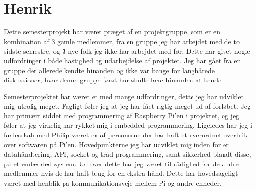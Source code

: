\section{Henrik}

Dette semesterprojekt har været præget af en projektgruppe, som er en kombination af 3 gamle medlemmer, fra en gruppe jeg har arbejdet med de to sidste semestre, og 3 nye folk jeg ikke har arbejdet med før. Dette har givet nogle udfordringer i både hastighed og udarbejdelse af projektet. Jeg har gået fra en gruppe der allerede kendte hinanden og ikke var bange for langhårede diskussioner, hvor denne gruppe først har skulle lære hinanden at kende.

Semesterprojektet har været et med mange udfordringer, dette jeg har udviklet mig utrolig meget. Fagligt føler jeg at jeg har fået rigtig meget ud af forløbet. Jeg har primært siddet med programmering af Raspberry Pi'en i projektet, og jeg føler at jeg virkelig har rykket mig i embedded programmering. Ligeledes har jeg i fællesskab med Philip været en af personerne der har haft et overordnet overblik over softwaren på Pi'en. Hovedpunkterne jeg har udviklet mig inden for er datahåndtering, API, socket og tråd programmering, samt sikkerhed blandt disse, på et embedded system.
Ud over dette har jeg været til rådighed for de andre medlemmer hvis de har haft brug for en ekstra hånd. Dette har hovedsageligt været med henblik på kommunikationsveje mellem Pi og andre enheder.